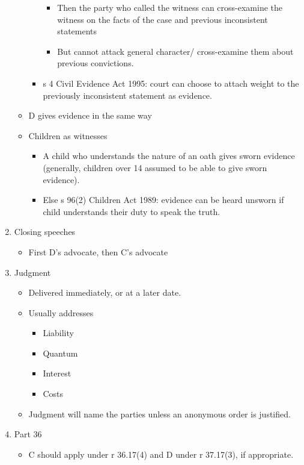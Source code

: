 \documentclass[
]{article}
\providecommand{\tightlist}{%
  \setlength{\itemsep}{0pt}\setlength{\parskip}{0pt}}
\begin{document}
\begin{enumerate}
\begin{itemize}
\begin{itemize}
      \begin{itemize}
      \tightlist
      \item
        Then the party who called the witness can cross-examine the
        witness on the facts of the case and previous inconsistent
        statements
      \item
        But cannot attack general character/ cross-examine them about
        previous convictions.
      \end{itemize}
    \item
      s 4 Civil Evidence Act 1995: court can choose to attach weight to
      the previously inconsistent statement as evidence.
    \end{itemize}
  \item
    D gives evidence in the same way
  \item
    Children as witnesses

    \begin{itemize}
    \tightlist
    \item
      A child who understands the nature of an oath gives sworn evidence
      (generally, children over 14 assumed to be able to give sworn
      evidence).
    \item
      Else s 96(2) Children Act 1989: evidence can be heard unsworn if
      child understands their duty to speak the truth.
    \end{itemize}
  \end{itemize}
\item
  Closing speeches

  \begin{itemize}
  \tightlist
  \item
    First D's advocate, then C's advocate
  \end{itemize}
\item
  Judgment

  \begin{itemize}
  \tightlist
  \item
    Delivered immediately, or at a later date.
  \item
    Usually addresses

    \begin{itemize}
    \tightlist
    \item
      Liability
    \item
      Quantum
    \item
      Interest
    \item
      Costs
    \end{itemize}
  \item
    Judgment will name the parties unless an anonymous order is
    justified.
  \end{itemize}
\item
  Part 36

  \begin{itemize}
  \tightlist
  \item
    C should apply under r 36.17(4) and D under r 37.17(3), if
    appropriate.
  \end{itemize}
\end{enumerate}
\end{document}
